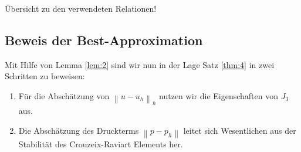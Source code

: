 \documentclass[a4paper]{scrartcl}
\newcommand{\J}[1]{J_{#1}}
\newcommand{\norm}[1]{\left\lVert#1\right\rVert}
\newcommand{\hnorm}[1]{\left\lVert#1\right\rVert_h}
\newcommand{\blue}{\color{blue}}
\newcommand{\red}{\color{red}}
\theoremstyle{plain}
\theoremstyle{definition}
\theoremstyle{remark}
\begin{document}
{\red
Übersicht zu den verwendeten Relationen! 
}

\subsection{Beweis der Best-Approximation}
\label{sec:beweis-der-best}

\blue
Mit Hilfe von Lemma \ref{lem:2} sind wir nun in der Lage Satz
\ref{thm:4} in zwei Schritten zu beweisen: 

\begin{enumerate}
\item Für die Abschätzung von \(\hnorm{u - u_h}\) nutzen wir die
  Eigenschaften von \(\J3\) aus. 
\item Die Abschätzung des Druckterms \(\norm{p - p_h}\) leitet sich
  Wesentlichen aus der Stabilität des Crouzeix-Raviart Elements her. 
\end{enumerate}
\end{document}
